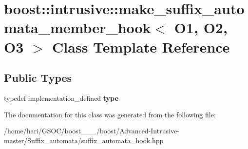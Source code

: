 \hypertarget{classboost_1_1intrusive_1_1make__suffix__automata__member__hook}{}\section{boost\+:\+:intrusive\+:\+:make\+\_\+suffix\+\_\+automata\+\_\+member\+\_\+hook$<$ O1, O2, O3 $>$ Class Template Reference}
\label{classboost_1_1intrusive_1_1make__suffix__automata__member__hook}
\subsection*{Public Types}
\begin{DoxyCompactItemize}
\item 
\mbox{\label{classboost_1_1intrusive_1_1make__suffix__automata__member__hook_a01166563956b1d994be6c34cba43efc1}} 
typedef implementation\+\_\+defined {\bfseries type}
\end{DoxyCompactItemize}


The documentation for this class was generated from the following file\+:\begin{DoxyCompactItemize}
\item 
/home/hari/\+G\+S\+O\+C/boost\+\_\+\_\+\_/boost/\+Advanced-\/\+Intrusive-\/master/\+Suffix\+\_\+automata/suffix\+\_\+automata\+\_\+hook.\+hpp\end{DoxyCompactItemize}
